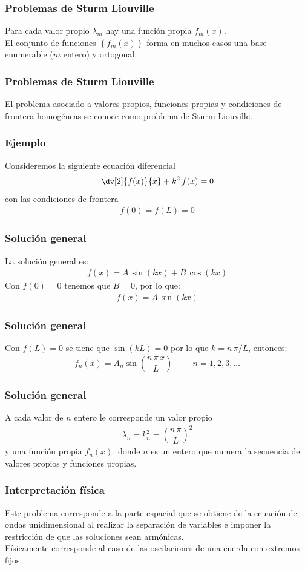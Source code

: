 \begin{frame}
\frametitle{Problemas de Sturm Liouville}
Para cada valor propio $\lambda_{m}$ hay una función propia $f_{m}(x)$.
\\
\bigskip
\pause
El conjunto de funciones $\left\{ f_{m}(x) \right\}$ forma en muchos casos una base enumerable ($m$ entero) y ortogonal.
\end{frame}
\begin{frame}
\frametitle{Problemas de Sturm Liouville}
El problema asociado a valores propios, funciones propias y condiciones de frontera homogéneas se conoce como problema de Sturm Liouville.
\end{frame}
\begin{frame}
\frametitle{Ejemplo}
Consideremos la siguiente ecuación diferencial
\begin{align*}
\dv[2]{f(x)}{x} + k^{2} \, f(x) = 0
\end{align*}
con las condiciones de frontera
\begin{align*}
f(0) = f(L) = 0
\end{align*}
\end{frame}
\begin{frame}
\frametitle{Solución general}
La solución general es:
\begin{align*}
f(x) = A \, \sin (kx) + B \, \cos (kx)
\end{align*}
\pause
Con $f(0) = 0$ tenemos que $B = 0$, por lo que:
\begin{align*}
f(x) = A \, \sin (kx)
\end{align*}
\end{frame}
\begin{frame}
\frametitle{Solución general}
Con $f(L) = 0$ se tiene que $\sin (kL) = 0$ por lo que $k = n \, \pi / L$, entonces:
\begin{align*}
f_{n} (x) = A_{n} \sin \left( \dfrac{n \, \pi \, x}{L} \right) \hspace{1cm} n = 1, 2, 3, \ldots
\end{align*}
\end{frame}
\begin{frame}
\frametitle{Solución general}
A cada valor de $n$ entero le corresponde un valor propio 
\begin{align*}
\lambda_{n} = k_{n}^{2} = \left( \dfrac{n \, \pi}{L} \right)^{2}
\end{align*}
 y una función propia $f_{n}(x)$, donde $n$ es un entero que numera la secuencia de valores propios y funciones propias.
\end{frame}
\begin{frame}
\frametitle{Interpretación física}
Este problema corresponde a la parte espacial que se obtiene de la ecuación de ondas unidimensional al realizar la separación de variables e imponer la restricción de que las soluciones sean armónicas.
\\
\bigskip
\pause
Físicamente corresponde al caso de las oscilaciones de una cuerda con extremos fijos.
\end{frame}
